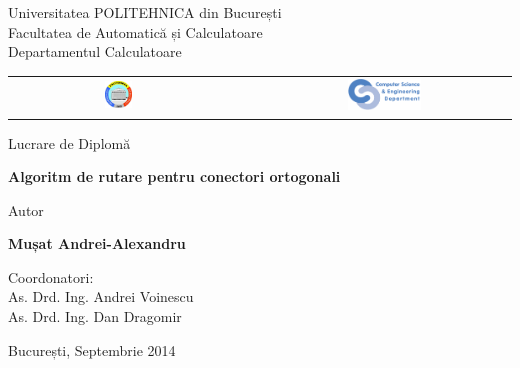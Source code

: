 


\pagestyle{empty}
\sffamily

\noindent
\begin{center}
	\Large
	Universitatea POLITEHNICA din București\\
	Facultatea de Automatică și Calculatoare\\
	Departamentul Calculatoare\\
	\begin{table}[h]
		\begin{center}
			\begin{tabular}{cccc}
				\includegraphics[width=0.13\textwidth]
				{img/upb.png}
				& & &
				\includegraphics[width=0.30\textwidth]
				{img/cs.png}
			\end{tabular}
		\end{center}
	\end{table}
\end{center}

\vfill\vfill
\begin{center}
	\Large
	Lucrare de Diplomă\\
\end{center}

\vfill
\begin{center}
	\HUGE\bfseries
	Algoritm de rutare pentru conectori ortogonali \\
	\vfill
	\large
\end{center}

\vfill
\begin{center}
	\Large
	Autor
\end{center}

\begin{center}
	\huge\bfseries
	Mușat Andrei-Alexandru
\end{center}

\vfill\vfill\vfill
\begin{center}
	\Large
	Coordonatori:\\
	As. Drd. Ing. Andrei Voinescu\\
	As. Drd. Ing. Dan Dragomir\\
\end{center}

\vfill
\begin{center}
	\large
	București, Septembrie 2014
\end{center}

\cleardoublepage

